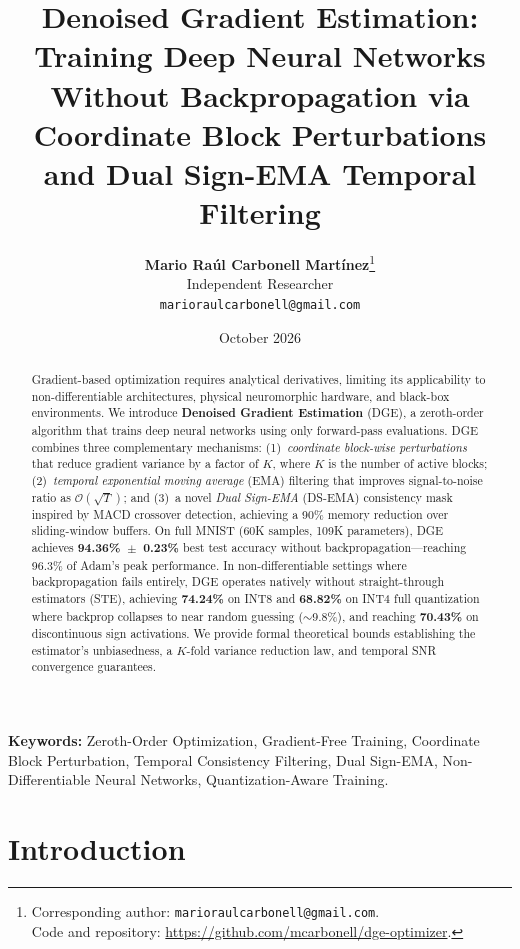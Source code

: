 \documentclass[11pt,a4paper]{article}
\title{\textbf{Denoised Gradient Estimation: \\ Training Deep Neural Networks Without Backpropagation via Coordinate Block Perturbations and Dual Sign-EMA Temporal Filtering}}
\author{
  \textbf{Mario Raúl Carbonell Martínez}\thanks{Corresponding author: \texttt{marioraulcarbonell@gmail.com}.\\Code and repository: \url{https://github.com/mcarbonell/dge-optimizer}.} \\
  Independent Researcher \\
  \texttt{marioraulcarbonell@gmail.com}
}
\date{October 2026}
\begin{document}
\maketitle

\begin{abstract}
Gradient-based optimization requires analytical derivatives, limiting its applicability to non-differentiable architectures, physical neuromorphic hardware, and black-box environments. We introduce \textbf{Denoised Gradient Estimation} (DGE), a zeroth-order algorithm that trains deep neural networks using only forward-pass evaluations. DGE combines three complementary mechanisms: (1)~\emph{coordinate block-wise perturbations} that reduce gradient variance by a factor of $K$, where $K$ is the number of active blocks; (2)~\emph{temporal exponential moving average} (EMA) filtering that improves signal-to-noise ratio as $\mathcal{O}(\sqrt{T})$; and (3)~a novel \emph{Dual Sign-EMA} (DS-EMA) consistency mask inspired by MACD crossover detection, achieving a 90\% memory reduction over sliding-window buffers. On full MNIST (60K samples, 109K parameters), DGE achieves \textbf{94.36\%~$\pm$~0.23\%} best test accuracy without backpropagation---reaching 96.3\% of Adam's peak performance. In non-differentiable settings where backpropagation fails entirely, DGE operates natively without straight-through estimators (STE), achieving \textbf{74.24\%} on INT8 and \textbf{68.82\%} on INT4 full quantization where backprop collapses to near random guessing ($\sim$9.8\%), and reaching \textbf{70.43\%} on discontinuous sign activations. We provide formal theoretical bounds establishing the estimator's unbiasedness, a $K$-fold variance reduction law, and temporal SNR convergence guarantees.
\end{abstract}

\vspace{0.5em}
\noindent\textbf{Keywords:} Zeroth-Order Optimization, Gradient-Free Training, Coordinate Block Perturbation, Temporal Consistency Filtering, Dual Sign-EMA, Non-Differentiable Neural Networks, Quantization-Aware Training.

\newpage

\section{Introduction}
\label{sec:intro}
\end{document}
